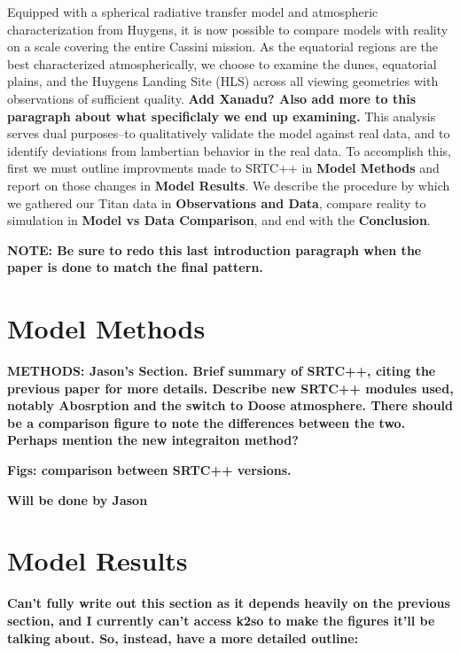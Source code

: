 \documentclass[twocolumn,linenumbers]{aastex631}
\begin{document}
Equipped with a spherical radiative transfer model and atmospheric characterization from Huygens, it is now possible to compare models with reality on a scale covering the entire Cassini mission. As the equatorial regions are the best characterized atmospherically, we choose to examine the dunes, equatorial plains, and the Huygens Landing Site (HLS) across all viewing geometries with observations of sufficient quality. \textbf{\color{red}Add Xanadu? Also add more to this paragraph about what specificlaly we end up examining.\color{black}} This analysis serves dual purposes--to qualitatively validate the model against real data, and to identify deviations from lambertian behavior in the real data. To accomplish this, first we must outline improvments made to SRTC++ in \textbf{Model Methods} and report on those changes in \textbf{Model Results}. We describe the procedure by which we gathered our Titan data in \textbf{Observations and Data}, compare reality to simulation in \textbf{Model vs Data Comparison}, and end with the \textbf{Conclusion}.

\textbf{\color{red}NOTE: Be sure to redo this last introduction paragraph when the paper is done to match the final pattern.\color{black}}

\section{Model Methods} \label{sec:model}

\textbf{\color{blue}METHODS: Jason's Section. Brief summary of SRTC++, citing the previous paper for more details. Describe new SRTC++ modules used, notably Abosrption and the switch to Doose atmosphere. There should be a comparison figure to note the differences between the two. Perhaps mention the new integraiton method?\color{black}}

\textbf{\color{blue}Figs: comparison between SRTC++ versions.\color{black}}

\textbf{\color{blue}Will be done by Jason \color{black}}

\section{Model Results} \label{sec:mresults}

\textbf{\color{blue}Can't fully write out this section as it depends heavily on the previous section, and I currently can't access k2so to make the figures it'll be talking about. So, instead, have a more detailed outline: \color{black}}
\end{document}
